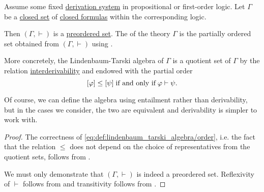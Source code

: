 \begin{definition}\label{def:lindenbaum_tarski_algebra}
  Assume some fixed \hyperref[def:proof_derivation_system]{derivation system} in propositional or first-order logic. Let \( \Gamma \) be a \hyperref[def:first_order_theory]{closed set} of \hyperref[def:first_order_syntax/ground_formula]{closed formulas} within the corresponding logic.

  Then \( (\Gamma, \vdash) \) is a \hyperref[def:preordered_set]{preordered set}. The  of the theory \( \Gamma \) is the partially ordered set obtained from \( (\Gamma, \vdash) \) using .

  More concretely, the Lindenbaum-Tarski algebra of \( \Gamma \) is a quotient set of \( \Gamma \) by the relation \hyperref[def:derivation_system_derivability]{interderivability} and endowed with the partial order
  \begin{equation}\label{eq:def:lindenbaum_tarski_algebra/order}
    [\varphi] \leq [\psi] \T{if and only if} \varphi \vdash \psi.
  \end{equation}

  Of course, we can define the algebra using entailment rather than derivability, but in the cases we consider, the two are equivalent and derivability is simpler to work with.
\end{definition}
\begin{proof}
  The correctness of \eqref{eq:def:lindenbaum_tarski_algebra/order}, i.e. the fact that the relation \( \leq \) does not depend on the choice of representatives from the quotient sets, follows from .

  We must only demonstrate that \( (\Gamma, \vdash) \) is indeed a preordered set. Reflexivity of \( \vdash \) follows from  and transitivity follows from .
\end{proof}

